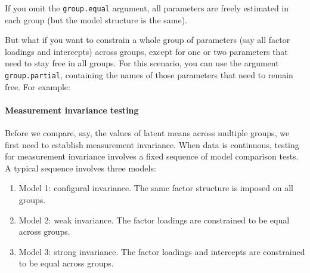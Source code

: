 If you omit the \texttt{group.equal} argument, all parameters are freely
estimated in each group (but the model structure is the same).

But what if you want to constrain a whole group of parameters (say all
factor loadings and intercepts) across groups, except for one or two
parameters that need to stay free in all groups. For this scenario, you
can use the argument \texttt{group.partial}, containing the names of
those parameters that need to remain free. For example:

\begin{Shaded}
\begin{Highlighting}[]
\OtherTok{\textless{}{-}} 
            \NormalTok{,}
            \NormalTok{(}\NormalTok{, }\NormalTok{),}
            \NormalTok{(}\NormalTok{, }\NormalTok{))}
\end{Highlighting}
\end{Shaded}

\hypertarget{measurement-invariance-testing}{%
\paragraph{Measurement invariance
testing}\label{measurement-invariance-testing}}

Before we compare, say, the values of latent means across multiple
groups, we first need to establish measurement invariance. When data is
continuous, testing for measurement invariance involves a fixed sequence
of model comparison tests. A typical sequence involves three models:

\begin{enumerate}
\def\labelenumi{\arabic{enumi}.}
\item
  Model 1: configural invariance. The same factor structure is imposed
  on all groups.
\item
  Model 2: weak invariance. The factor loadings are constrained to be
  equal across groups.
\item
  Model 3: strong invariance. The factor loadings and intercepts are
  constrained to be equal across groups.
\end{enumerate}

